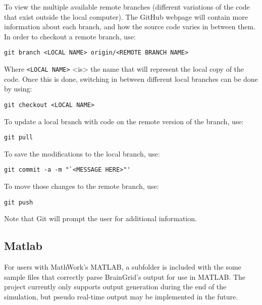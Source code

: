 \noindent \mdseries To view the multiple available remote branches (different variations of the code that exist outside the local computer). The GitHub webpage will contain more information about each branch, and how the source code varies in between them. In order to checkout a remote branch, use:
\begin{verbatim}
git branch <LOCAL NAME> origin/<REMOTE BRANCH NAME>
\end{verbatim}

\noindent \mdseries Where \verb|<LOCAL NAME>| <is> the name that will represent the local copy of the code. Once this is done, switching in between different local branches can be done by using:
\begin{verbatim}
git checkout <LOCAL NAME> 
\end{verbatim}

\noindent \mdseries To update a local branch with code on the remote version of the branch, use:
\begin{verbatim}
git pull
\end{verbatim}

\noindent \mdseries To save the modifications to the local branch, use:
\begin{verbatim}
git commit -a -m "`<MESSAGE HERE>"'
\end{verbatim}

\noindent \mdseries To move those changes to the remote branch, use:
\begin{verbatim}
git push
\end{verbatim}

\noindent \mdseries Note that Git will prompt the user for additional information.

\subsection{Matlab}
\mdseries For users with MathWork's MATLAB, a subfolder is included with the some sample files that correctly parse BrainGrid's output for use in MATLAB. The project currently only supports output generation during the end of the simulation, but pseudo real-time output may be implemented in the future.
\pagebreak
